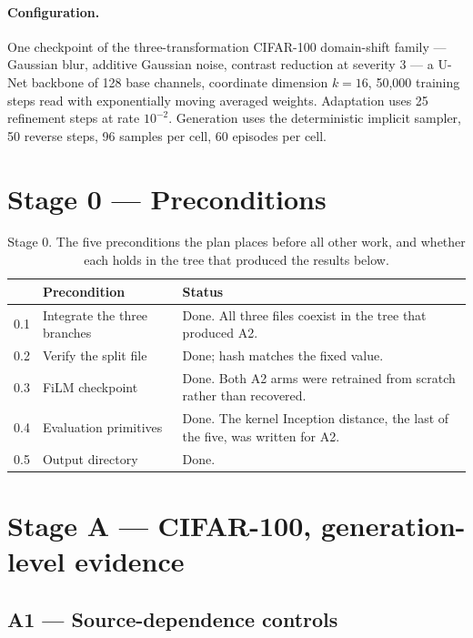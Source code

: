 \documentclass{article}
\begin{document}
\paragraph{Configuration.} One checkpoint of the three-transformation CIFAR-100 domain-shift
family --- Gaussian blur, additive Gaussian noise, contrast reduction at severity 3 --- a
U-Net backbone of 128 base channels, coordinate dimension $k=16$, 50{,}000 training steps
read with exponentially moving averaged weights. Adaptation uses 25 refinement steps at rate
$10^{-2}$. Generation uses the deterministic implicit sampler, 50 reverse steps, 96 samples
per cell, 60 episodes per cell.

\section{Stage 0 --- Preconditions}

\begin{table}[h]
\centering
\small
\begin{tabular}{llp{7.4cm}}
\toprule
& Precondition & Status\\
\midrule
0.1 & Integrate the three branches & Done. All three files coexist in the tree that produced A2.\\
0.2 & Verify the split file & Done; hash matches the fixed value.\\
0.3 & FiLM checkpoint & Done. Both A2 arms were retrained from scratch rather than recovered.\\
0.4 & Evaluation primitives & Done. The kernel Inception distance, the last of the five, was written for A2.\\
0.5 & Output directory & Done.\\
\bottomrule
\end{tabular}
\caption{Stage 0. The five preconditions the plan places before all other work, and whether
each holds in the tree that produced the results below.}
\end{table}

\FloatBarrier

\section{Stage A --- CIFAR-100, generation-level evidence}

\subsection{A1 --- Source-dependence controls}
\end{document}
